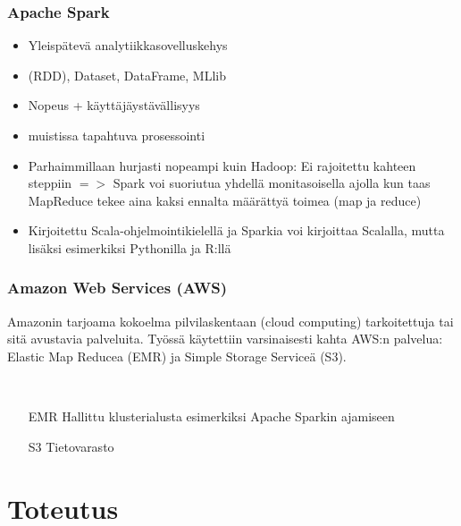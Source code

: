 \documentclass{beamer}
\begin{document}

\begin{frame}
\frametitle{Apache Spark}

\begin{itemize}
	\item Yleispätevä analytiikkasovelluskehys
	\item (RDD), Dataset, DataFrame, MLlib
	\item Nopeus + käyttäjäystävällisyys
	\item muistissa tapahtuva prosessointi
	\item Parhaimmillaan hurjasti nopeampi kuin Hadoop: Ei rajoitettu kahteen steppiin $=>$ Spark voi suoriutua yhdellä monitasoisella ajolla kun taas MapReduce tekee aina kaksi ennalta määrättyä toimea (map ja reduce)
	\item Kirjoitettu Scala-ohjelmointikielellä ja Sparkia voi kirjoittaa Scalalla, mutta lisäksi esimerkiksi Pythonilla ja R:llä
\end{itemize}

\end{frame}


\begin{frame}
\frametitle{Amazon Web Services (AWS)}

Amazonin tarjoama kokoelma pilvilaskentaan (cloud computing) tarkoitettuja tai sitä avustavia palveluita.
Työssä käytettiin varsinaisesti kahta AWS:n palvelua: Elastic Map Reducea (EMR) ja Simple Storage Serviceä (S3).

~

\begin{itemize}
	\item [EMR] Hallittu klusterialusta esimerkiksi Apache Sparkin ajamiseen
	\item [S3] Tietovarasto
\end{itemize}

\end{frame}


\section{Toteutus}
\end{document}
